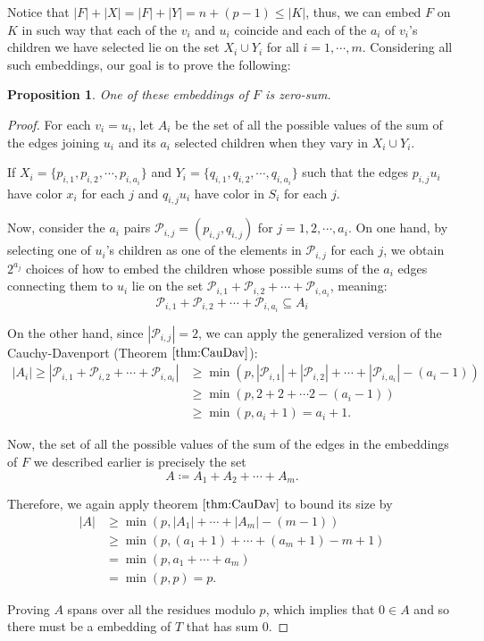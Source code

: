 \documentclass{article}
\numberwithin{table}{section}
\newtheorem{prop}[theorem]{Proposition}
\begin{document}
Notice that $|F|+|X|  =|F|+|Y| =  n+(p-1)\leq |K|$, thus, we can embed $F$ on $K$ in such way that each of the $v_i$ and $u_i$ coincide and each of the $a_i$ of $v_i$'s children we have selected lie on the set $X_i\cup Y_i$ for all $i=1,\cdots,m$.  Considering all such embeddings, our goal is to prove the following:
\medskip
\begin{prop}\label{CauDavProf1}
    One of these embeddings of $F$ is zero-sum.
\end{prop}
\begin{proof}
    For each $v_i = u_i$, let $A_i$ be the set of all the possible values of the sum of the edges joining $u_i$ and its $a_i$ selected children when they vary in $X_i\cup Y_i$.

If $X_i = \{p_{i,1},p_{i,2},\cdots,p_{i,a_i}\}$ and $Y_i = \{q_{i,1},q_{i,2},\cdots,q_{i,a_i}\}$ such that the edges $p_{i,j}u_i$ have color $x_i$ for each $j$ and $q_{i,j}u_i$ have color in $S_i$ for each $j$. 

Now, consider the $a_i$ pairs $\mathcal{P}_{i,j} = (p_{i,j},q_{i,j})$ for $j =1,2,\cdots,a_i$. On one hand, by selecting one of $u_i$'s children as one of the elements in $\mathcal{P}_{i,j}$ for each $j$, we obtain $2^{a_j}$ choices of how to embed the children whose possible sums of the $a_i$ edges connecting them to $u_i$ lie on the set $\mathcal{P}_{i,1}+\mathcal{P}_{i,2}+\cdots+\mathcal{P}_{i,a_i}$, meaning:
$$\mathcal{P}_{i,1}+\mathcal{P}_{i,2}+\cdots+\mathcal{P}_{i,a_i}\subseteq A_i$$

On the other hand, since $|\mathcal{P}_{i,j}| = 2$, we can apply the generalized version of the Cauchy-Davenport (Theorem $\ref{thm:CauDav}$):
\begin{align*}
    |A_i|
    \geq |\mathcal{P}_{i,1}+\mathcal{P}_{i,2}+\cdots+\mathcal{P}_{i,a_i}| 
    &\geq \min(p,|\mathcal{P}_{i,1}|+|\mathcal{P}_{i,2}|+\cdots+|\mathcal{P}_{i,a_i}|-(a_i-1))\\
    &\geq \min (p,2+2+\cdots2-(a_i-1))\\
    &\geq \min(p,a_i+1) = a_i+1.
\end{align*}


\medskip

Now, the set of all the possible values of the sum of the edges in the embeddings of $F$ we described earlier is precisely the set $$A \coloneq A_1+A_2+\cdots+A_{m}.$$ 


Therefore, we again apply theorem $\ref{thm:CauDav}$ to bound its size by
\begin{align*}
    |A| 
    &\geq \min(p,|A_1|+\cdots+|A_m|-(m-1))\\
    &\geq\min(p,(a_1+1)+\cdots+(a_m+1)-m+1)\\
    &= \min(p,a_1+\cdots+a_m)\\
    &= \min(p,p) = p.
\end{align*}
    
Proving $A$ spans over all the residues modulo $p$, which implies that $0\in A$ and so there must be a embedding of $T$ that has sum $0$.
\end{proof}
\end{document}
